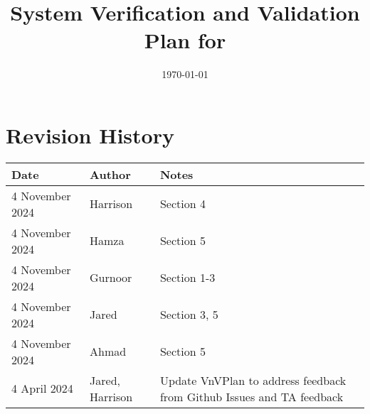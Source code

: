 \documentclass[12pt, titlepage]{article}
\begin{document}
\title{System Verification and Validation Plan for \progname{}}
\author{\authname}
\date{\today}

\maketitle


\section*{Revision History}

\begin{tabularx}{\textwidth}{p{6cm}p{2cm}X}
  \toprule {\bf Date} & {\bf Author} & {\bf Notes}\\
  \midrule
  4 November 2024 & Harrison & Section 4 \\
  4 November 2024 & Hamza & Section 5 \\
  4 November 2024 & Gurnoor & Section 1-3 \\
  4 November 2024 & Jared & Section 3, 5 \\
  4 November 2024 & Ahmad & Section 5 \\
  4 April 2024 & Jared, Harrison & Update VnVPlan to address feedback from Github Issues and TA feedback \\
  \bottomrule
\end{tabularx}

~\\


\newpage

\tableofcontents
\end{document}

